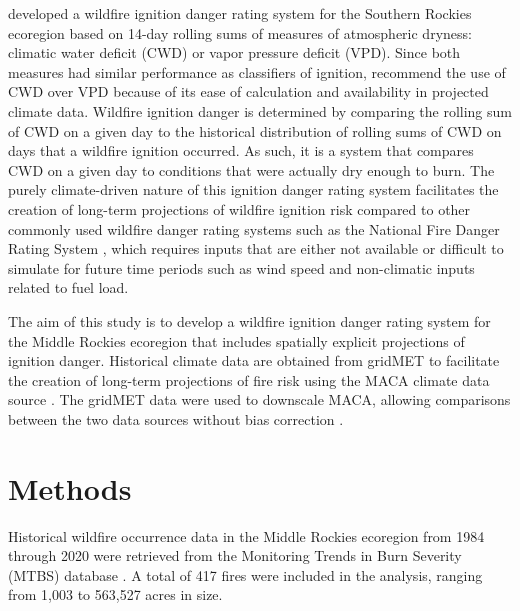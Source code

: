 \documentclass[11pt]{article}
\begin{document}
\citet{thomaWaterBalanceIndicator2020} developed a wildfire ignition danger rating system for the Southern Rockies ecoregion \citep{omernikEcoregionsConterminousUnited1987} based on 14-day rolling sums of measures of atmospheric dryness: climatic water deficit (CWD) or vapor pressure deficit (VPD). Since both measures had similar performance as classifiers of ignition, \citet{thomaWaterBalanceIndicator2020} recommend the use of CWD over VPD because of its ease of calculation and availability in projected climate data.  Wildfire ignition danger is determined by comparing the rolling sum of CWD on a given day to the historical distribution of rolling sums of CWD on days that a wildfire ignition occurred. As such, it is a system that compares CWD on a given day to conditions that were actually dry enough to burn. The purely climate-driven nature of this ignition danger rating system facilitates the creation of long-term projections of wildfire ignition risk compared to other commonly used wildfire danger rating systems such as the National Fire Danger Rating System \citep{degrootChapter11Wildland2015}, which requires inputs that are either not available or difficult to simulate for future time periods such as wind speed and non-climatic inputs related to fuel load.

The aim of this study is to develop a wildfire ignition danger rating system for the Middle Rockies ecoregion that includes spatially explicit projections of ignition danger. Historical climate data are obtained from gridMET to facilitate the creation of long-term projections of fire risk using the MACA climate data source \citep{abatzoglouComparisonStatisticalDownscaling2012}.  The gridMET data were used to downscale MACA, allowing comparisons between the two data sources without bias correction \citep{tercekRobustProjectionsConsequences2023}.



\section{Methods}

Historical wildfire occurrence data in the Middle Rockies ecoregion \citep{omernikEcoregionsConterminousUnited1987} from 1984 through 2020 were retrieved from the Monitoring Trends in Burn Severity (MTBS) database \citep{eidenshinkProjectMonitoringTrends2007}.  A total of 417 fires were included in the analysis, ranging from 1,003 to 563,527 acres in size.  
\end{document}
